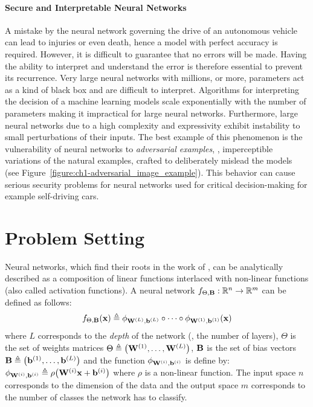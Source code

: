 \paragraph{Secure and Interpretable Neural Networks}
A mistake by the neural network governing the drive of an autonomous vehicle can lead to injuries or even death, hence a model with perfect accuracy is required.
However, it is difficult to guarantee that no errors will be made.
Having the ability to interpret and understand the error is therefore essential to prevent its recurrence.
Very large neural networks with millions, or more, parameters act as a kind of black box and are difficult to interpret.
Algorithms \cite{lundberg2017unified} for interpreting the decision of a machine learning models scale exponentially with the number of parameters making it impractical for large neural networks. 
Furthermore, large neural networks due to a high complexity and expressivity exhibit instability to small perturbations of their inputs.
The best example of this phenomenon is the vulnerability of neural networks to \emph{adversarial examples}, \ie, imperceptible variations of the natural examples, crafted to deliberately mislead the models~\cite{globerson2006nightmare,biggio2013evasion,szegedy2013intriguing} (see Figure~\ref{figure:ch1-adversarial_image_example}). 
This behavior can cause serious security problems for neural networks used for critical decision-making for example self-driving cars.


\section{Problem Setting}
\label{section:ch1-problem_setting}

Neural networks, which find their roots in the work of \citet{mcculloch1943logical,rosenblatt1958perceptron}, can be analytically described as a composition of linear functions interlaced with non-linear functions (also called activation functions).
A neural network $f_{\Theta,\mathbf{B}} : \mathbb{R}^n \rightarrow \mathbb{R}^m$ can be defined as follows:
\begin{equation}
  f_{\Theta,\mathbf{B}}(\mathbf{x}) \triangleq \phi_{\mathbf{W}^{(L)}, \mathbf{b}^{(L)}} \circ \cdots \circ \phi_{\mathbf{W}^{(1)}, \mathbf{b}^{(1)}}(\mathbf{x})
  \label{equation:ch1-neural_network}
\end{equation}
where $L$ corresponds to the \emph{depth} of the network (\ie, the number of layers), $\Theta$ is the set of weights matrices $\Theta \triangleq \left( \Wmat^{(1)}, \dots, \Wmat^{(L)} \right)$, $\mathbf{B}$ is the set of bias vectors $\Bmat \triangleq \left( \bvec^{(1)}, \dots, \bvec^{(L)} \right)$ and the function $\phi_{\mathbf{W}^{(i)},\mathbf{b}^{(i)}}$ is define by: $\phi_{\Wmat^{(i)},\bvec^{(i)}} \triangleq \rho\left(\Wmat^{(i)}\xvec + \bvec^{(i)}\right)$ where $\rho$ is a non-linear function.
The input space $n$ corresponds to the dimension of the data and the output space $m$ corresponds to the number of classes the network has to classify.

